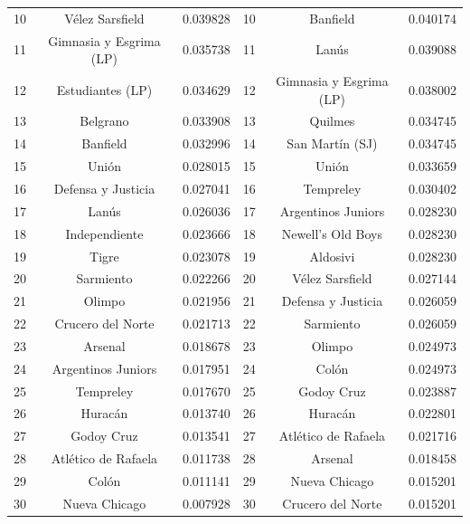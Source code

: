 \begin{center}
\begin{tabular}{|c|c|c||c|c|c|}
                        10 & Vélez Sarsfield & 0.039828         & 10 & Banfield & 0.040174 \\
                        11 & Gimnasia y Esgrima (LP) & 0.035738 & 11 & Lanús & 0.039088 \\
                        12 & Estudiantes (LP) & 0.034629        & 12 & Gimnasia y Esgrima (LP) & 0.038002 \\
                        13 & Belgrano & 0.033908                & 13 & Quilmes & 0.034745 \\
                        14 & Banfield & 0.032996                & 14 & San Martín (SJ) & 0.034745 \\
                        15 & Unión & 0.028015                   & 15 & Unión & 0.033659 \\
                        16 & Defensa y Justicia & 0.027041      & 16 & Tempreley & 0.030402 \\
                        17 & Lanús & 0.026036                   & 17 & Argentinos Juniors & 0.028230 \\
                        18 & Independiente & 0.023666           & 18 & Newell's Old Boys & 0.028230 \\
                        19 & Tigre & 0.023078                   & 19 & Aldosivi & 0.028230 \\
                        20 & Sarmiento & 0.022266               & 20 & Vélez Sarsfield & 0.027144 \\
                        21 & Olimpo & 0.021956                  & 21 & Defensa y Justicia & 0.026059 \\
                        22 & Crucero del Norte & 0.021713       & 22 & Sarmiento & 0.026059 \\
                        23 & Arsenal & 0.018678                 & 23 & Olimpo & 0.024973 \\
                        24 & Argentinos Juniors & 0.017951      & 24 & Colón & 0.024973 \\
                        25 & Tempreley & 0.017670               & 25 & Godoy Cruz & 0.023887 \\
                        26 & Huracán & 0.013740                 & 26 & Huracán & 0.022801 \\
                        27 & Godoy Cruz & 0.013541              & 27 & Atlético de Rafaela & 0.021716 \\
                        28 & Atlético de Rafaela & 0.011738     & 28 & Arsenal & 0.018458 \\
                        29 & Colón & 0.011141                   & 29 & Nueva Chicago & 0.015201 \\
                        30 & Nueva Chicago & 0.007928           & 30 & Crucero del Norte & 0.015201 \\
                        \hline
                    \end{tabular}
                \end{center}

